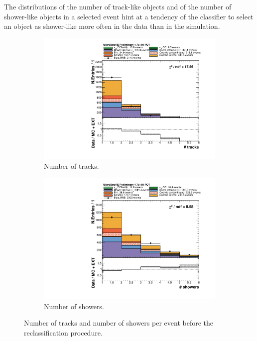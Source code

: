 The distributions of the number of track-like objects and of the number of shower-like objects in a selected event hint at a tendency of the classifier to select an object as shower-like more often in the data than in the simulation.


\begin{figure}[htbp]
\centering
  \begin{subfigure}{0.45\textwidth}
    \includegraphics[width=\linewidth]{figures/h_n_tracks_before.pdf}
    \caption{Number of tracks.} 
  \end{subfigure}
    \begin{subfigure}{0.45\textwidth}
    \includegraphics[width=\linewidth]{figures/h_n_showers_before.pdf}
    \caption{Number of showers.} 
  \end{subfigure}
  \caption{Number of tracks and number of showers per event before the reclassification procedure.}\label{fig:nshowers}
\end{figure}

